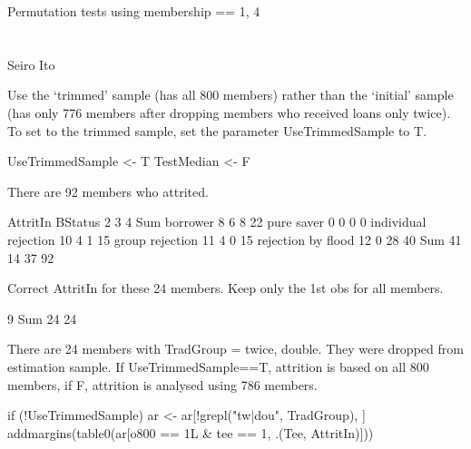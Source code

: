 \hfil Permutation tests using \textsf{membership} == 1, 4\\

\hfil\MonthDY\\
\hfil{\footnotesize\currenttime}\\

\hfil Seiro Ito

\setcounter{tocdepth}{3}

\setlength{\parindent}{1em}
\vspace{2ex}


Use the `trimmed' sample (has all 800 members) rather than the `initial' sample (has only 776 members after dropping members who received loans only twice). To set to the trimmed sample, set the parameter \textsf{UseTrimmedSample} to T.
\begin{Schunk}
\begin{Sinput}
UseTrimmedSample <- T
TestMedian <- F
\end{Sinput}
\end{Schunk}

There are 92 members who attrited.
\begin{Schunk}
\begin{Soutput}
                      AttritIn
BStatus                 2  3  4 Sum
  borrower              8  6  8  22
  pure saver            0  0  0   0
  individual rejection 10  4  1  15
  group rejection      11  4  0  15
  rejection by flood   12  0 28  40
  Sum                  41 14 37  92
\end{Soutput}
\end{Schunk}

Correct \textsf{AttritIn} for these 24 members. Keep only the 1st obs for all members.
\begin{Schunk}
\begin{Soutput}

  9 Sum 
 24  24 
\end{Soutput}
\end{Schunk}
There are 24 members with TradGroup = twice, double. They were dropped from estimation sample. If \textsf{UseTrimmedSample==T}, attrition is based on all 800 members, if \textsf{F}, attrition is analysed using 786 members.
\begin{Schunk}
\begin{Sinput}
if (!UseTrimmedSample) ar <- ar[!grepl("tw|dou", TradGroup), ]
addmargins(table0(ar[o800 == 1L & tee == 1, .(Tee, AttritIn)]))
\end{Sinput}
\end{Schunk}

